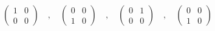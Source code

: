 \begin{equation}
\left(
\begin{array}{cc}
\mbox{1}  & \mbox{0} \\ \mbox{0} & \mbox{0}
\end{array}
\right) \quad , \quad  \left(
\begin{array}{cc}
\mbox{0}  & \mbox{0} \\ \mbox{1} & \mbox{0}
\end{array}
\right) \quad , \quad  \left(
\begin{array}{cc}
\mbox{0}  & \mbox{1} \\ \mbox{0} & \mbox{0}
\end{array}
\right) \quad , \quad  \left(
\begin{array}{cc}
\mbox{0}  & \mbox{0} \\ \mbox{1} & \mbox{0}
\end{array}
\right)
\label{4cp2}
\end{equation}

